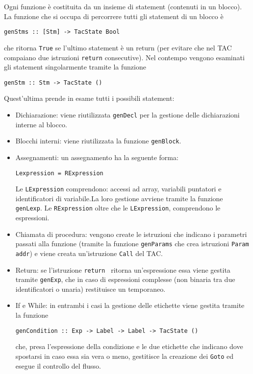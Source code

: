 \begin{itemize}

Ogni funzione è costituita da un insieme di statement (contenuti in un blocco). La funzione che si occupa di percorrere tutti gli statement di un blocco è 
\begin{center}
    {\tt genStms :: [Stm] -> TacState Bool}
\end{center}
che ritorna {\tt True} se l'ultimo statement è un return (per evitare che nel TAC compaiano due istruzioni {\tt return} consecutive). Nel contempo vengono esaminati gli statement singolarmente tramite la funzione
\begin{center}
    {\tt genStm :: Stm -> TacState ()}
\end{center}
Quest'ultima prende in esame tutti i possibili statement:
\begin{itemize}
    \item Dichiarazione: viene riutilizzata {\tt genDecl} per la gestione delle dichiarazioni interne al blocco.
    \item Blocchi interni: viene riutilizzata la funzione {\tt genBlock}.
    \item Assegnamenti: un assegnamento ha la seguente forma:
    \begin{center}
        {\tt Lexpression = RExpression}
    \end{center}
    Le {\tt LExpression} comprendono: accessi ad array, variabili puntatori e identificatori di variabile.La loro gestione avviene tramite la funzione {\tt genLexp}. Le {\tt RExpression} oltre che le {\tt LExpression}, comprendono le espressioni.
    \item Chiamata di procedura: vengono create le istruzioni che indicano i parametri passati alla funzione (tramite la funzione {\tt genParams} che crea istruzioni {\tt Param addr}) e viene creata un'istruzione {\tt Call} del TAC.
    \item Return: se l'istruzione {\tt return } ritorna un'espressione essa viene gestita tramite {\tt genExp}, che in caso di espressioni complesse (non binaria tra due identificatori o unaria) restituisce un temporaneo.
    \item If e While: in entrambi i casi la gestione delle etichette viene gestita tramite la funzione 
    \begin{center}
        {\tt genCondition :: Exp -> Label -> Label -> TacState ()}
    \end{center}
    che, presa l'espressione della condizione e le due etichette che indicano dove spostarsi in caso essa sia vera o meno, gestitisce la creazione dei {\tt Goto} ed esegue il controllo del flusso.
\end{itemize}


\end{itemize}
